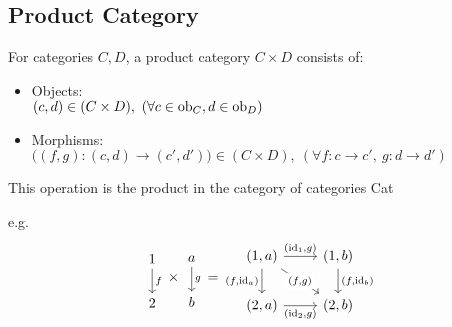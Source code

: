\subsection{Product Category}
For categories $C,D$, a product category $C\times D$ consists of:
\parencite{awodey:category_theory}
\begin{itemize}
  \item Objects:\\
    $(c, d) \in (C\times D)
      ,\ (\forall c \in \mathrm{ob}_C, d \in \mathrm{ob}_D)$
  \item Morphisms:\\
    $\big((f,g) : (c,d) \to (c', d')\big)\in(C\times D)
      ,\ (\forall f: c \to c',\ g:d \to d')$
\end{itemize}
This operation is the product in the category of categories Cat

e.g.
\[
  \begin{tikzcd}
    1 \\
    2
    \arrow["f", from=1-1, to=2-1]
  \end{tikzcd}
  \times
  \begin{tikzcd}
    a \\
    b
    \arrow["g", from=1-1, to=2-1]
  \end{tikzcd}
  =
  \begin{tikzcd}
    {(1,a)} & {(1,b)} \\
    {(2,a)} & {(2,b)}
    \arrow["{(\id_1,g)}", from=1-1, to=1-2]
    \arrow["{(f,\id_a)}"', from=1-1, to=2-1]
    \arrow["{(\id_2,g)}"', from=2-1, to=2-2]
    \arrow["{(f,\id_b)}", from=1-2, to=2-2]
    \arrow["{(f,g)}"{description}, from=1-1, to=2-2]
  \end{tikzcd}
\]